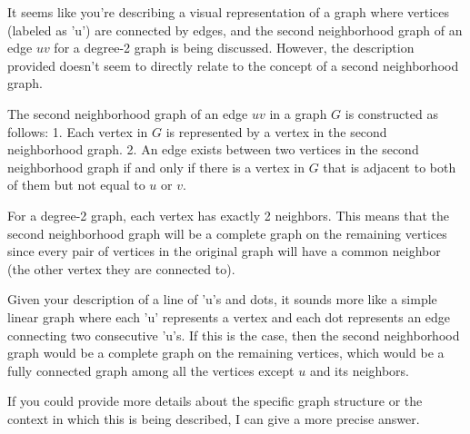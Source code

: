 It seems like you're describing a visual representation of a graph where vertices (labeled as 'u') are connected by edges, and the second neighborhood graph of an edge \(uv\) for a degree-2 graph is being discussed. However, the description provided doesn't seem to directly relate to the concept of a second neighborhood graph.

The second neighborhood graph of an edge \(uv\) in a graph \(G\) is constructed as follows:
1. Each vertex in \(G\) is represented by a vertex in the second neighborhood graph.
2. An edge exists between two vertices in the second neighborhood graph if and only if there is a vertex in \(G\) that is adjacent to both of them but not equal to \(u\) or \(v\).

For a degree-2 graph, each vertex has exactly 2 neighbors. This means that the second neighborhood graph will be a complete graph on the remaining vertices since every pair of vertices in the original graph will have a common neighbor (the other vertex they are connected to).

Given your description of a line of 'u's and dots, it sounds more like a simple linear graph where each 'u' represents a vertex and each dot represents an edge connecting two consecutive 'u's. If this is the case, then the second neighborhood graph would be a complete graph on the remaining vertices, which would be a fully connected graph among all the vertices except \(u\) and its neighbors.

If you could provide more details about the specific graph structure or the context in which this is being described, I can give a more precise answer.
